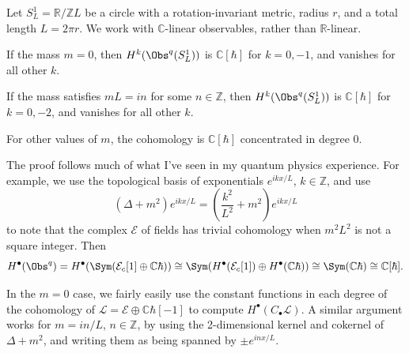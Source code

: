 Let $S^1_L = \mathbb{R} /\mathbb{Z} L$ be a circle with a rotation-invariant metric, radius $r$, and a total length $L=2\pi r$. We work with $\mathbb{C} $-linear observables, rather than $\mathbb{R} $-linear.

\begin{proposition}\label{prp:8-1-2}
	If the mass $m=0$, then $H^k(\Obs^{q} (S^1_L))$ is $\mathbb{C} [\hbar ]$ for $k=0,-1$, and vanishes for all other $k$.

	If the mass satisfies $mL = in$ for some $n\in\mathbb{Z} $, then $H^k(\Obs^{q} (S^1_L))$ is $\mathbb{C} [\hbar ]$ for $k=0,-2$, and vanishes for all other $k$.

	For other values of $m$, the cohomology is $\mathbb{C} [\hbar ]$ concentrated in degree 0.
\end{proposition}

The proof follows much of what I've seen in my quantum physics experience. For example, we use the topological basis of exponentials $e^{ikx/L} $, $k\in\mathbb{Z} $, and use
\[
	(\Delta +m^2)e^{ikx/L} =\left( \frac{k^2}{L^2} +m^2 \right) e^{ikx/L} 
\]
to note that the complex $\mathcal{E} $ of fields has trivial cohomology when $m^2L^2$ is not a square integer. Then
\[
	H^{\bullet} (\Obs^{q} ) = H^{\bullet} (\Sym (\mathcal{E}_c[1] \oplus \mathbb{C} \hbar))\cong \Sym (H^{\bullet} (\mathcal{E} _c[1]) \oplus H^{\bullet} (\mathbb{C} \hbar))\cong \Sym (\mathbb{C} \hbar)\cong \mathbb{C} [\hbar ]
.\]

In the $m=0$ case, we fairly easily use the constant functions in each degree of the cohomology of $\mathcal{L} = \mathcal{E} \oplus \mathbb{C} \hbar[-1]$ to compute $H^{\bullet} (C_{\bullet} \mathcal{L} )$. A similar argument works for $m=in/L$, $n\in\mathbb{Z} $, by using the 2-dimensional kernel and cokernel of $\Delta +m^2$, and writing them as being spanned by $\pm e^{inx/L} $.
